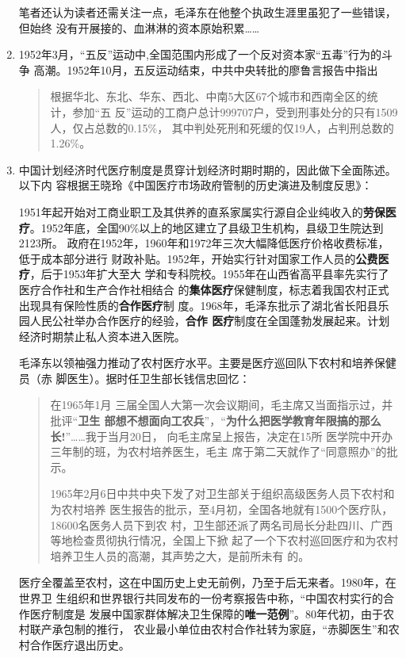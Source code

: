 \begin{enumerate}
  笔者还认为读者还需关注一点，毛泽东在他整个执政生涯里虽犯了一些错误，但始终
  没有开展接的、血淋淋的资本原始积累……


\item 1952年3月，“五反”运动中,全国范围内形成了一个反对资本家“五毒”行为的斗争
  高潮。1952年10月，五反运动结束，中共中央转批的廖鲁言报告中指出
  \begin{quotation}
    根据华北、东北、华东、西北、中南5大区67个城市和西南全区的统计，参加“五
    反”运动的工商户总计999707户，受到刑事处分的只有1509人，仅占总数的0.15\%，
    其中判处死刑和死缓的仅19人，占判刑总数的1.26\%。
  \end{quotation}

\item 中国计划经济时代医疗制度是贯穿计划经济时期时期的，因此做下全面陈述。以下内
  容根据王晓玲《中国医疗市场政府管制的历史演进及制度反思》\cite{yiliaoshi}：

  1951年起开始对工商业职工及其供养的直系家属实行源自企业纯收入的\textbf{劳保医
    疗}。1952年底，全国90\%以上的地区建立了县级卫生机构，县级卫生院达到2123所。
  政府在1952年，1960年和1972年三次大幅降低医疗价格收费标准，低于成本部分进行
  财政补贴。1952年，开始实行针对国家工作人员的\textbf{公费医疗}，后于1953年扩大至大
  学和专科院校。1955年在山西省高平县率先实行了医疗合作社和生产合作社相结合
  的\textbf{集体医疗}保健制度，标志着我国农村正式出现具有保险性质的\textbf{合作医疗}制
  度。1968年，毛泽东批示了湖北省长阳县乐园人民公社举办合作医疗的经验，\textbf{合作
    医疗}制度在全国蓬勃发展起来。计划经济时期禁止私人资本进入医院。

  毛泽东以领袖强力推动了农村医疗水平。主要是医疗巡回队下农村和培养保健员（赤
  脚医生）。据时任卫生部长钱信忠回忆：
  \begin{quotation}
    在1965年1月 三届全国人大第一次会议期间，毛主席又当面指示过，并批评“\textbf{卫生
    部想不想面向工农兵}”，“\textbf{为什么把医学教育年限搞的那么长!}”……我于当月20日，
    向毛主席呈上报告，决定在15所 医学院中开办三年制的班，为农村培养医生，毛主
    席于第二天就作了“同意照办”的批示。

    1965年2月6日中共中央下发了对卫生部关于组织高级医务人员下农村和为农村培养
    医生报告的批示，至4月初，全国各地就有1500个医疗队，18600名医务人员下到农
    村，卫生部还派了两名司局长分赴四川、广西等地检查贯彻执行情况，全国上下掀
    起了一个下农村巡回医疗和为农村培养卫生人员的高潮，其声势之大，是前所未有
    的。
  \end{quotation}

  医疗全覆盖至农村，这在中国历史上史无前例，乃至于后无来者。1980年，在世界卫
  生组织和世界银行共同发布的一份考察报告中称，“中国农村实行的合作医疗制度是
  发展中国家群体解决卫生保障的\textbf{唯一范例}”。80年代初，由于农村联产承包制的推行，
  农业最小单位由农村合作社转为家庭，“赤脚医生”和农村合作医疗退出历史。


\end{enumerate}
